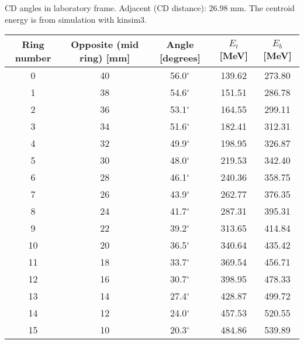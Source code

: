 \caption{CD angles in laboratory frame. Adjacent (CD distance): 26.98 mm. The centroid energy is from simulation with kinsim3.}
\label{tab:CD_angles}
\begin{tabular}{ccccc}
\hline
Ring number  &  Opposite (mid ring) [mm] &  Angle [degrees]  &  $E_t$ [MeV]  &  $E_b$ [MeV]  \\
\hline
0            &  40                       &  56.0$^\circ$     &  139.62       &  273.80       \\
1            &  38                       &  54.6$^\circ$     &  151.51       &  286.78       \\
2            &  36                       &  53.1$^\circ$     &  164.55       &  299.11       \\
3            &  34                       &  51.6$^\circ$     &  182.41       &  312.31       \\
4            &  32                       &  49.9$^\circ$     &  198.95       &  326.87       \\
5            &  30                       &  48.0$^\circ$     &  219.53       &  342.40       \\
6            &  28                       &  46.1$^\circ$     &  240.36       &  358.75       \\
7            &  26                       &  43.9$^\circ$     &  262.77       &  376.35       \\
8            &  24                       &  41.7$^\circ$     &  287.31       &  395.31       \\
9            &  22                       &  39.2$^\circ$     &  313.65       &  414.84       \\
10           &  20                       &  36.5$^\circ$     &  340.64       &  435.42       \\
11           &  18                       &  33.7$^\circ$     &  369.54       &  456.71       \\
12           &  16                       &  30.7$^\circ$     &  398.95       &  478.33       \\
13           &  14                       &  27.4$^\circ$     &  428.87       &  499.72       \\
14           &  12                       &  24.0$^\circ$     &  457.53       &  520.55       \\
15           &  10                       &  20.3$^\circ$     &  484.86       &  539.89       \\
\hline
\end{tabular}
